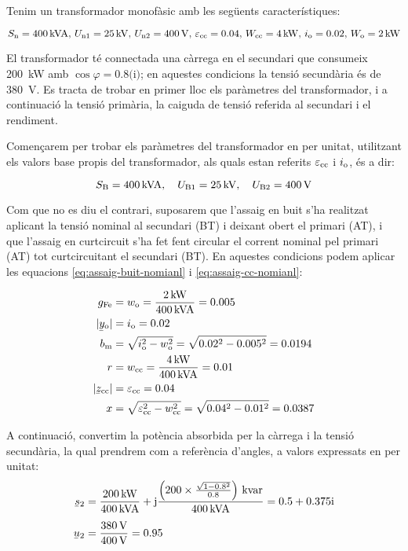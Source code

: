 \begin{exemple}
    Tenim un transformador monofàsic amb les següents característiques:

    \[S_\mathrm{n}=\qty{400}{kVA},\,U_\mathrm{n1}=\qty{25}{kV},\, U_\mathrm{n2}=\qty{400}{V},\, \varepsilon_\mathrm{cc}=\num{0,04},\, W_\mathrm{cc}=\qty{4}{kW},\, i_\mathrm{o}=\num{0,02},\,  W_\mathrm{o}=\qty{2}{kW}\]

     El transformador té connectada una càrrega en el secundari que consumeix \qty{200}{kW} amb $\cos{\varphi}=\num{0,8}\text{(i)}$; en aquestes condicions la tensió secundària és de \qty{380}{V}.
    Es tracta de trobar en primer lloc els paràmetres del transformador, i a continuació la tensió primària, la caiguda de tensió referida al secundari i el rendiment.

    Començarem per trobar els paràmetres del transformador en per unitat, utilitzant els valors base propis del transformador, als quals estan referits $\varepsilon_\mathrm{cc}$ i $i_\mathrm{o}$, és a dir:

    \[ S_\mathrm{B}=\qty{400}{kVA},\quad U_\mathrm{B1}=\qty{25}{kV},\quad U_\mathrm{B2}=\qty{400}{V}\]

    Com que no es diu el contrari, suposarem que l'assaig en buit s'ha realitzat aplicant la tensió nominal al secundari (BT) i deixant obert el primari (AT), i que l'assaig en curtcircuit s'ha fet fent circular el corrent nominal pel primari (AT) tot curtcircuitant el secundari (BT). En aquestes condicions podem aplicar les equacions \eqref{eq:assaig-buit-nomianl} i \eqref{eq:assaig-cc-nomianl}:

   \begin{align*}
        g\ped{Fe} &= w\ped{o} = \frac{\qty{2}{kW}}{\qty{400}{kVA}} = \num{0,005} \\
        |\cmplx{y}\ped{o}| &= i\ped{o}  = \num{0,02} \\
        b\ped{m} &= \sqrt{i\ped{o}^2 - w\ped{o}^2} = \sqrt{\num{0,02}^2 - \num{0,005}^2} = \num{0,0194}\\
        r &= w\ped{cc} = \frac{\qty{4}{kW}}{\qty{400}{kVA}} = \num{0,01} \\
        |\cmplx{z}\ped{cc}| &=  \varepsilon\ped{cc} = \num{0,04} \\
        x &= \sqrt{\varepsilon\ped{cc}^2 - w\ped{cc}^2} = \sqrt{\num{0,04}^2-\num{0,01}^2} = \num{0,0387}
  \end{align*}

        A continuació, convertim la potència absorbida per la càrrega i la tensió secundària, la qual prendrem com a referència d'angles,  a valors expressats en per unitat:
  \begin{align*}
    \cmplx{s}_2 &= \frac{\qty{200}{kW}}{\qty{400}{kVA}} + \ju \frac{\left(200\times \frac{\sqrt{1-\num{0,8}^2}}{\num{0,8}}\right)\unit{\,kvar}}{\qty{400}{kVA}} =
    \complexnum{0,5 + j 0,375}\\[1ex]
    \cmplx{u}_2 &= \frac{\qty{380}{V}}{\qty{400}{V}} = \num{0,95}
  \end{align*}


\end{exemple}
